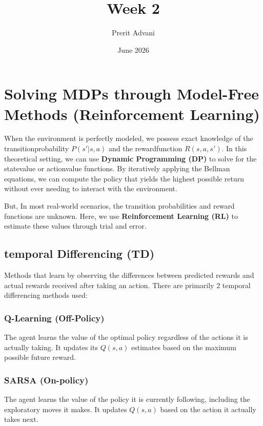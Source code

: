 \documentclass{article}
\title{Week 2}
\author{Prerit Advani}
\date{June 2026}
\begin{document}
\maketitle

\section{Solving MDPs through Model-Free Methods (Reinforcement Learning)}

When the environment is perfectly modeled, we possess exact knowledge of the \gls{transitionprobability} $P(s'|s, a)$ and the \gls{rewardfunction} $R(s, a, s')$. In this theoretical setting, we can use \textbf{Dynamic Programming (DP)} to solve for the \gls{statevalue} or \gls{actionvalue} functions. By iteratively applying the Bellman equations, we can compute the \gls{policy} that yields the highest possible return without ever needing to interact with the environment.


But, In most real-world scenarios, the transition probabilities and reward functions are unknown. Here, we use \textbf{Reinforcement Learning (RL)} to estimate these values through trial and error.

\subsection{temporal Differencing (TD)}

Methods that learn by observing the differences between predicted rewards and actual rewards received after taking an action. There are primarily 2 temporal differencing methods used:

\subsubsection{Q-Learning (Off-Policy)}

The agent learns the value of the optimal policy regardless of the actions it is actually taking. It updates its $Q(s, a)$ estimates based on the maximum possible future reward.

\subsubsection{SARSA (On-policy)}

The agent learns the value of the policy it is currently following, including the exploratory moves it makes. It updates $Q(s, a)$ based on the action it actually takes next.
\end{document}
